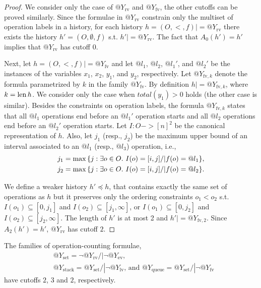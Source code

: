 \begin{proof}%

  We consider only the case of $@Y_\mathrm{rv}$ and $@Y_\mathrm{fv}$, the other
  cutoffs can be proved similarly.
  Since the formulae in $@Y_\mathrm{rv}$ constrain only the multiset of operation
  labels in a history, for each history $h=(O,<,f) |= @Y_\mathrm{rv}$ there
  exists the history $h'=(O,\emptyset,f)$ s.t. $h' |= @Y_\mathrm{rv}$. The
  fact that $A_0(h')=h'$ implies that $@Y_\mathrm{rv}$ has cutoff $0$.
 
  Next, let $h=(O,<,f) |= @Y_\mathrm{fv}$ and let $@l_1$, $@l_2$, $@l_1'$, and
  $@l_2'$ be the instances of the variables $x_1$, $x_2$, $y_1$, and $y_2$,
  respectively. Let $@Y_{\mathrm{fv},k}$ denote the formula parametrized by $k$ in the family $@Y_\mathrm{fv}$.
  By definition $h |=  @Y_{\mathrm{fv},k}$, where $k=\operatorname{len} h$.
  We consider only the case when $total(y_1)>0$ holds (the other
  case is similar). Besides the constraints on operation labels, the formula $@Y_{\mathrm{fv},k}$ 
  states that all $@l_1$ operations end before an $@l_1'$
  operation starts and all $@l_2$ operations end before an $@l_2'$ operation
  starts. Let $I:O->[n]^2$ be the canonical representation of $h$. Also, let
  $j_1$ (resp., $j_2$) be the maximum upper bound of an interval associated to
  an $@l_1$ (resp., $@l_3$) operation, i.e.,
  \begin{align*}
    j_1 = \max{\{ j:\exists o\in O.\ I(o) = [i,j] /| f(o)=@l_1 \}},\\
    j_2 = \max{\{ j:\exists o\in O.\ I(o) = [i,j] /| f(o)=@l_2 \}}.
  \end{align*}
 
  We define a weaker history $h'\preceq h$, that contains exactly the same set
  of operations as $h$ but it preserves only the ordering constraints $o_1<o_2$ s.t. 
  $I(o_1)\subseteq [0,j_1]$ and $I(o_2)\subseteq [j_1,\infty]$, or
  $I(o_1)\subseteq [0,j_2]$ and $I(o_2)\subseteq [j_2,\infty]$. The
  length of $h'$ is at most 2
  and $h'|= @Y_{\mathrm{fv},2}$. Since $A_2(h')=h'$, 
  $@Y_\mathrm{rv}$ has cutoff $2$.
\end{proof}

\begin{corollary}

  The families of operation-counting formulae,
  \begin{align*}
    & @Y_\mathrm{set}   = \lnot @Y_\mathrm{rv} /| \lnot @Y_\mathrm{ev}
    \text{, } \\
    & @Y_\mathrm{stack} = @Y_\mathrm{set} /| \lnot @Y_\mathrm{lv}
    \text{, and }
    @Y_\mathrm{queue} = @Y_\mathrm{set} /| \lnot @Y_\mathrm{fv}
  \end{align*}
  have cutoffs $2$, $3$ and $2$, respectively.

\end{corollary}

